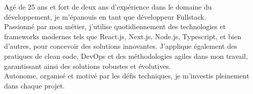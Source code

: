 
\begin{cvparagraph}
    Agé de 25 ans et fort de deux ans d'expérience dans le domaine du développement, je m'épanouis en tant que développeur Fullstack.\\
    Passionné par mon métier, j'utilise quotidiennement des technologies et frameworks modernes tels que React.js, Next.js, Node.js, Typescript, et bien d'autres, pour concevoir des solutions innovantes. J'applique également des pratiques de clean code, DevOps et des méthodologies agiles dans mon travail, garantissant ainsi des solutions robustes et évolutives.\\
    Autonome, organisé et motivé par les défis techniques, je m'investis pleinement dans chaque projet.
\end{cvparagraph}
